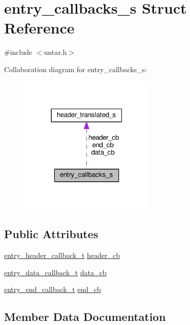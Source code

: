 \hypertarget{structentry__callbacks__s}{}\section{entry\+\_\+callbacks\+\_\+s Struct Reference}
\label{structentry__callbacks__s}


{\ttfamily \#include $<$untar.\+h$>$}



Collaboration diagram for entry\+\_\+callbacks\+\_\+s\+:
\nopagebreak
\begin{figure}[H]
\begin{center}
\leavevmode
\includegraphics[width=184pt]{structentry__callbacks__s__coll__graph}
\end{center}
\end{figure}
\subsection*{Public Attributes}
\begin{DoxyCompactItemize}
\item 
\hyperlink{untar_8h_a1c5dcb2e8970ba5ccdf77644e2754cfa}{entry\+\_\+header\+\_\+callback\+\_\+t} \hyperlink{structentry__callbacks__s_a8178d65eecc3afea86f1c65bd8952e96}{header\+\_\+cb}
\item 
\hyperlink{untar_8h_a67c5aa42c3de330e5500cf719a31d799}{entry\+\_\+data\+\_\+callback\+\_\+t} \hyperlink{structentry__callbacks__s_a52f309045c5324b2ef4d46e95f586043}{data\+\_\+cb}
\item 
\hyperlink{untar_8h_a9dc7702ff84fa8a872cc408a4eb1418d}{entry\+\_\+end\+\_\+callback\+\_\+t} \hyperlink{structentry__callbacks__s_abe7ed69246927a746f4a257fa07211b0}{end\+\_\+cb}
\end{DoxyCompactItemize}


\subsection{Member Data Documentation}
